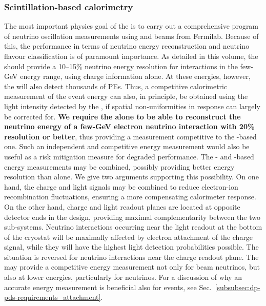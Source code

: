 \subsubsection{Scintillation-based calorimetry}

The most important physics goal of the \dune {} is to carry out a comprehensive program of neutrino oscillation measurements using \numu and \anumu beams from Fermilab. Because of this, the \dune {} performance in terms of neutrino energy reconstruction and neutrino flavour classification is of paramount importance. As detailed in this volume, the  should provide a 10--15\% neutrino energy resolution for \nue {} interactions in the few-GeV energy range, using charge information alone. At these energies, however, the  will also detect thousands of PEs. Thus, a competitive calorimetric measurement of the event energy can also, in principle, be obtained using the light intensity detected by the , if spatial non-uniformities in  response can largely be corrected for. {\bf We require the  alone to be able to reconstruct the neutrino energy of a few-GeV electron neutrino  interaction with 20\%  resolution or better}, thus providing a measurement competitive to the -based one. Such an independent and competitive energy measurement would also be useful as a risk mitigation measure for degraded  performance. The - and -based energy measurements may be combined, possibly providing better energy resolution than  alone. We give two arguments supporting this possibility. On one hand, the charge and light signals may be combined to reduce electron-ion recombination fluctuations, ensuring a more compensating  calorimeter response. On the other hand, charge and light readout planes are located at opposite detector ends in the  design, providing maximal complementarity between the two sub-systems. Neutrino interactions occurring near the light readout at the bottom of the cryostat will be maximally affected by electron attachment of the charge signal, while they will have the highest light detection probabilities possible. The situation is reversed for neutrino interactions near the charge readout plane. The  may provide a competitive energy measurement not only for beam neutrinos, but also at lower energies, particularly for  neutrinos. For a discussion of why an accurate energy measurement is beneficial also for  events, see Sec.~\ref{subsubsec:dp-pds-requirements_attachment}.

